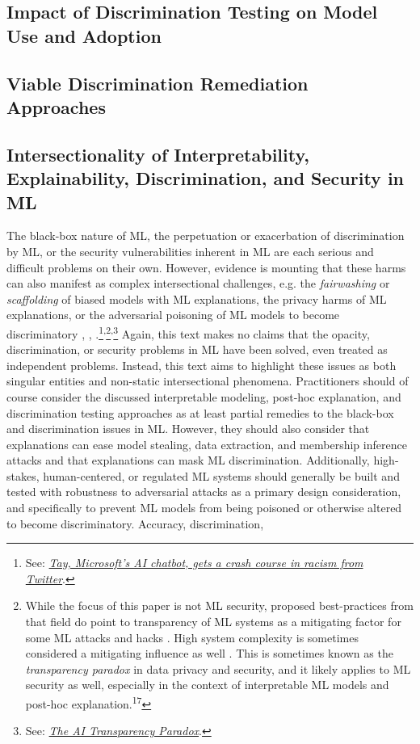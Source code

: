 \documentclass[information,article,submit,moreauthors,pdftex]{definitions/mdpi}
\begin{document}
{\subsection{Impact of Discrimination Testing on Model Use and Adoption}

\subsection{Viable Discrimination Remediation Approaches}

\subsection{Intersectionality of Interpretability, Explainability, Discrimination, and Security in ML}

The black-box nature of ML, the perpetuation or exacerbation of discrimination by ML, or the security vulnerabilities inherent in ML are each serious and difficult problems on their own. However, evidence is mounting that these harms can also manifest as complex intersectional challenges, e.g. the \textit{fairwashing} or \textit{scaffolding} of biased models with ML explanations, the privacy harms of ML explanations, or the adversarial poisoning of ML models to become discriminatory \cite{shokri2019privacy}, \cite{fair_washing}, \cite{scaffolding}.\footnote{See: \href{https://www.theguardian.com/technology/2016/mar/24/tay-microsofts-ai-chatbot-gets-a-crash-course-in-racism-from-twitter}{\textit{Tay, Microsoft's AI chatbot, gets a crash course in racism from Twitter}}.}\textsuperscript{,}\footnote{While the focus of this paper is not ML security, proposed best-practices from that field do point to transparency of ML systems as a mitigating factor for some ML attacks and hacks \cite{papernot2018marauder}. High system complexity is sometimes considered a mitigating influence as well \cite{hoare19811980}. This is sometimes known as the \textit{transparency paradox} in data privacy and security, and it likely applies to ML security as well, especially in the context of interpretable ML models and post-hoc explanation.\textsuperscript{17}}\textsuperscript{,}\footnote{See: \href{https://hbr.org/2019/12/the-ai-transparency-paradox}{\textit{The AI Transparency Paradox}}.} Again, this text makes no claims that the opacity, discrimination, or security problems in ML have been solved, even treated as independent problems. Instead, this text aims to highlight these issues as both singular entities and non-static intersectional phenomena. Practitioners should of course consider the discussed interpretable modeling, post-hoc explanation, and discrimination testing approaches as at least partial remedies to the black-box and discrimination issues in ML. However, they should also consider that explanations can ease model stealing, data extraction, and membership inference attacks and that explanations can mask ML discrimination. Additionally, high-stakes, human-centered, or regulated ML systems should generally be built and tested with robustness to adversarial attacks as a primary design consideration, and specifically to prevent ML models from being poisoned or otherwise altered to become discriminatory. Accuracy, discrimination, }
\end{document}
